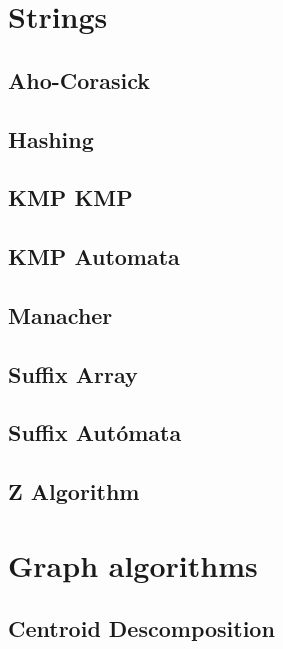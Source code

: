 \section{Strings}
\subsection{Aho-Corasick}
\raggedbottom
\hrulefill
\subsection{	Hashing}
\raggedbottom
\hrulefill
\subsection{KMP		KMP}
\raggedbottom
\hrulefill
\subsection{KMP Automata}
\raggedbottom
\hrulefill
\subsection{Manacher}
\raggedbottom
\hrulefill
\subsection{Suffix Array}
\raggedbottom
\hrulefill
\subsection{Suffix Autómata}
\raggedbottom
\hrulefill
\subsection{   Z Algorithm}
\raggedbottom
\hrulefill

\section{Graph algorithms}
\subsection{   Centroid Descomposition}
\raggedbottom
\hrulefill
